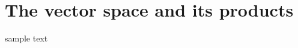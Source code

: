 \documentclass[book.tex]{subfiles}
\begin{document}
\chapter{The vector space and its products}

sample text
\autocite{Hastie_2009}
\end{document}
